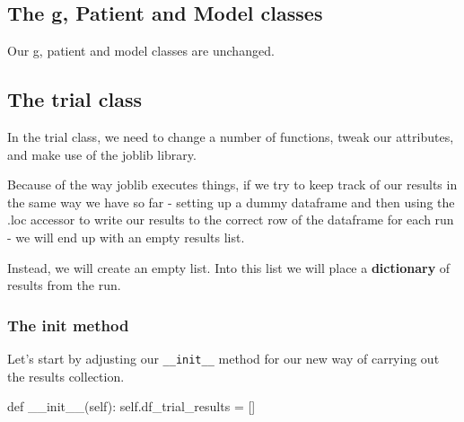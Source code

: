 \documentclass[
  letterpaper,
  DIV=11,
  numbers=noendperiod]{scrreprt}
\newenvironment{Shaded}{}{}
\newcommand{\FunctionTok}[1]{\textcolor[rgb]{0.44,0.26,0.76}{#1}}
\newcommand{\KeywordTok}[1]{\textcolor[rgb]{0.84,0.23,0.29}{#1}}
\newcommand{\NormalTok}[1]{\textcolor[rgb]{0.14,0.16,0.18}{#1}}
\newcommand{\OperatorTok}[1]{\textcolor[rgb]{0.14,0.16,0.18}{#1}}
\newcommand{\VariableTok}[1]{\textcolor[rgb]{0.89,0.38,0.04}{#1}}
\begin{document}
\subsection{The g, Patient and Model
classes}\label{the-g-patient-and-model-classes}

Our g, patient and model classes are unchanged.

\subsection{The trial class}\label{the-trial-class-11}

In the trial class, we need to change a number of functions, tweak our
attributes, and make use of the joblib library.

\begin{tcolorbox}[enhanced jigsaw, colframe=quarto-callout-warning-color-frame, bottomtitle=1mm, breakable, rightrule=.15mm, coltitle=black, colbacktitle=quarto-callout-warning-color!10!white, opacityback=0, leftrule=.75mm, arc=.35mm, toptitle=1mm, title=\textcolor{quarto-callout-warning-color}{\faExclamationTriangle}\hspace{0.5em}{Warning}, titlerule=0mm, colback=white, toprule=.15mm, bottomrule=.15mm, left=2mm, opacitybacktitle=0.6]

Because of the way joblib executes things, if we try to keep track of
our results in the same way we have so far - setting up a dummy
dataframe and then using the .loc accessor to write our results to the
correct row of the dataframe for each run - we will end up with an empty
results list.

Instead, we will create an empty list. Into this list we will place a
\textbf{dictionary} of results from the run.

\end{tcolorbox}

\subsubsection{\texorpdfstring{The \textbf{init}
method}{The init method}}\label{the-init-method-12}

Let's start by adjusting our \texttt{\_\_init\_\_} method for our new
way of carrying out the results collection.

\begin{Shaded}
\begin{Highlighting}[]
\KeywordTok{def}  \FunctionTok{\_\_init\_\_}\NormalTok{(}\VariableTok{self}\NormalTok{):}
    \VariableTok{self}\NormalTok{.df\_trial\_results }\OperatorTok{=}\NormalTok{ []}
\end{Highlighting}
\end{Shaded}
\end{document}
